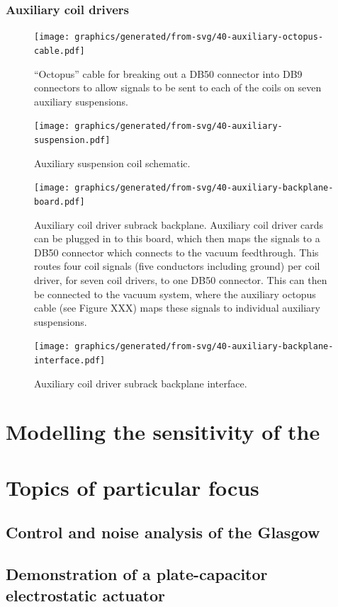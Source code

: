 \subsubsection{Auxiliary coil drivers}

\begin{figure}
  \centering
  \texttt{[image: graphics/generated/from-svg/40-auxiliary-octopus-cable.pdf]}
  \caption[Auxiliary octopus cable schematic]{\label{fig:aux-octopus-cable-wiring}``Octopus'' cable for breaking out a DB50 connector into DB9 connectors to allow signals to be sent to each of the coils on seven auxiliary suspensions.}
\end{figure}

\begin{figure}
  \centering
  \texttt{[image: graphics/generated/from-svg/40-auxiliary-suspension.pdf]}
  \caption[Auxiliary suspension coil schematic]{\label{fig:aux-suspension-wiring}Auxiliary suspension coil schematic.}
\end{figure}

\begin{figure}
  \centering
  \texttt{[image: graphics/generated/from-svg/40-auxiliary-backplane-board.pdf]}
  \caption[Auxiliary subrack backplane board schematic]{\label{fig:aux-backplane-schematic}Auxiliary coil driver subrack backplane. Auxiliary coil driver cards can be plugged in to this board, which then maps the signals to a DB50 connector which connects to the vacuum feedthrough. This routes four coil signals (five conductors including ground) per coil driver, for seven coil drivers, to one DB50 connector. This can then be connected to the vacuum system, where the auxiliary octopus cable (see Figure XXX) maps these signals to individual auxiliary suspensions.}
\end{figure}

\begin{figure}
  \centering
  \texttt{[image: graphics/generated/from-svg/40-auxiliary-backplane-interface.pdf]}
  \caption[Auxiliary subrack backplane interface]{\label{fig:aux-backplane-interface}Auxiliary coil driver subrack backplane interface.}
\end{figure}

\section{Modelling the sensitivity of the \SSM{}}

\section{Topics of particular focus}

\subsection{Control and noise analysis of the Glasgow \SSM{}}

\subsection{Demonstration of a plate-capacitor electrostatic actuator}